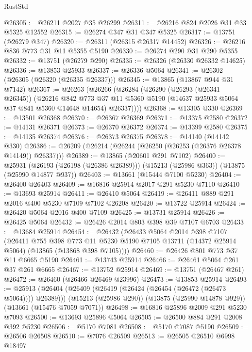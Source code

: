 \begin{lexlean}{RustStd}
\begin{coremodule}
@26305 := @26211 @2027 @35 @26299
@26311 := @26216 @824 @2026 @31 @33 @5325 @12552
@26315 := @26274 @347 @31 @347 @5325
@26317 := @13751 (@26279 @347)
@26320 := @26311 (@26315 @26317 @14452)
@26326 := @26216 @836 @773 @31 @11 @5355 @5190
@26330 := @26274 @290 @31 @290 @5355
@26332 := @13751 (@26279 @290)
@26335 := @26326 (@26330 @26332 @14625)
@26336 := @13853 @25933
@26337 := @26336 @5064
@26341 := @26302 (@26305 (@26320 (@26335 @26337)))
@26345 := @13865 (@13867 @944 @31 @7142)
@26367 := @26263
    (@26266
      (@26284
        (@26290
          (@26293 (@26341 @26345))
          (@26216
            @842
            @773
            @37
            @11
            @5360
            @5190
            (@14637 @25933 @5064 @37 @841 @5360 @14648 @14654)
            @26337))))
@26368 := @13305 @330
@26369 := @13501 @26368
@26370 := @26367 @26369
@26371 := @13375 @2580
@26372 := @14131 @26371
@26373 := @26370 @26372
@26374 := @13399 @2580
@26375 := @14135 @26374
@26376 := @26373 @26375
@26378 := @14140 (@14142 @330)
@26386 := @26209 (@26214 (@26244 (@26250 (@26253 (@26376 @26378 @14149)) @26337)))
@26389 := @13865 (@20601 @291 @7102)
@26400 := @25931
    (@26193 (@26198 (@26386 @26389)))
    (@15213 (@25986 @363))
    (@13875 (@25990 @14877 @937))
@26403 := @13661 (@15444 @7100 @5230)
@26404 := @26400 @26403
@26409 := @16816 @25914 @2017 @291 @5230 @7110
@26410 := @13693 @25914
@26411 := @26410 @5064
@26419 := @26411 @889 @291 @2016 @400 @5230 @7109 @7102 @26208
@26420 := @13722 @25914
@26424 := @26420 @5064 @2016 @400 @7109
@26425 := @13731 @25914
@26426 := @26425 @5064
@26432 := @26426 @2014 @803 @398 @39 @7107 @6703
@26433 := @13684 @25914
@26454 := @26432
    (@26433
      @5064
      @2014
      @398
      @7107
      (@26411
        @755
        @398
        @773
        @11
        @5230
        @5190
        @7105
        @13711
        (@14372 @25914 @5064)
        (@13865 (@13868 @398 @7105))))
@26460 := @26426 @801 @773 @37 @11 @6665 @5190
@26461 := @13743 @25914
@26466 := @26461 @5064 @261 @37 @261 @6665
@26467 := @13752 @25914
@26469 := @13751 (@26467 @261)
@26472 := @26460 (@26466 @26469 @23996)
@26473 := @13853 @25914
@26493 := @25913
    (@26404 (@26409 (@26419 (@26424 (@26454 (@26472 (@26473 @5064)))) @26389)))
    (@15213 (@25986 @290))
    (@13875 (@25990 @14878 @929))
    (@13661 (@15476 @7059 @7071))
@26498 := @16816 @25896 @2009 @291 @5230 @7093
@26500 := @13693 @25896 @5064
@26505 := @26500 @884 @291 @2008 @392 @5230
@26506 := @5170 @7081
@26508 := @5170 @7087 @5190
@26509 := @26506 @26508
@26510 := @7076 @26509
@26513 := @26505 @26510 @6998 @18497

\end{coremodule}
\end{lexlean}
